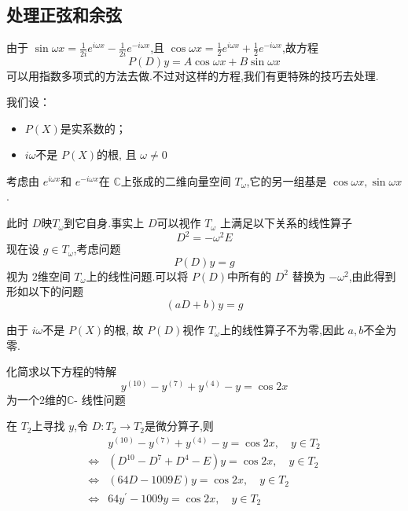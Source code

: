 \documentclass[lang=cn,12pt,color=green,fontset=none]{elegantbook}
\begin{document}
\subsection{处理正弦和余弦}

由于 \(  \sin  \omega x = \frac{1 }{2i } e^{i  \omega x}- \frac{1 }{2i } e^{- i  \omega x}    \),且 \(  \cos   \omega x  = \frac{1}{2}e^{i \omega x} +  \frac{1}{2} e^{-i \omega x} \),故方程 \[
P\left( D \right)y= A\cos  \omega x+ B\sin  \omega x 
\]可以用指数多项式的方法去做.不过对这样的方程,我们有更特殊的技巧去处理.

\noindent 我们设：
\begin{itemize}
    \item \(  P\left( X \right)   \)是实系数的；
    \item \(  i \omega   \)不是 \(  P\left( X \right)   \)的根,  且 \(   \omega \neq 0  \)    
\end{itemize}


考虑由 \(  e^{i \omega x}  \)和 \(  e^{-i \omega x}  \)在 \(  \mathbb{C}   \)上张成的二维向量空间 \(  T_{ \omega }  \),它的另一组基是 \(  \cos  \omega x,\sin  \omega x  \)     .

此时 \(  D  \)映\(  T_{ \omega }  \)到它自身.事实上 \(  D  \)可以视作 \(  T_{ \omega }  \) 上满足以下关系的线性算子 \[
D^{2}=- \omega ^{2}E
\]
现在设 \(  g \in T_{ \omega }  \),考虑问题 \[
P\left( D \right)y=g 
\] 视为 \(  2  \)维空间 \(  T_{ \omega }  \)上的线性问题.可以将 \(  P\left( D \right)   \)中所有的 \(  D^{2}  \)    替换为 \(  - \omega ^{2}  \),由此得到形如以下的问题 \[
\left( aD+ b \right)y=g 
\] 

\begin{remark}
    由于 \(  i \omega   \)不是 \(  P\left( X \right)   \)的根,  故 \(  P\left( D \right)   \)视作 \(  T_{ \omega }  \)上的线性算子不为零,因此 \(  a,b  \)不全为零.   
\end{remark}

\begin{example}\label{ex:deal-sin-cos}
    化简求以下方程的特解\[
    y^{\left( 10 \right) }-y^{\left( 7 \right) }+ y^{\left( 4 \right) }-y=\cos 2x
    \]为一个2维的\(  \mathbb{C}   \)- 线性问题
\end{example}

\begin{solution}
    在 \(  T_{2}  \)上寻找 \(  y  \),令     \(  D:T_{2}\to T_{2}  \)是微分算子,则 \[
        \begin{aligned}
           & y^{\left( 10 \right) }-y^{\left( 7 \right) }+ y^{\left( 4 \right) }-y = \cos 2x ,\quad  y \in T_{2}\\ 
           \iff & \left( D^{10}-D^{7}+ D^{4}-E \right)y=\cos 2x,\quad y\in T_{2}\\ 
            \iff &  \left( 64D -1009E  \right)y=\cos 2x ,\quad y \in T_{2}\\ 
             \iff & 64y^{\prime} -1009y=\cos 2x,\quad y \in T_{2}
        \end{aligned}
        \]   
    
\end{solution}
\end{document}
